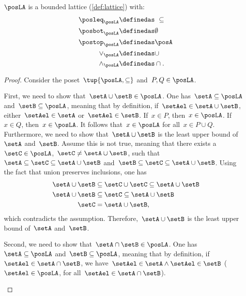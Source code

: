 \begin{definition}[Lattice]
\begin{lemma}
  $\posLA$ is a bounded lattice (\cref{def:lattice}) with:
  \begin{equation}
  \begin{aligned}
    \posleq_{\posLA}&\definedas \ \subseteq\\
    \posbot_{\posLA}&\definedas \emptyset\\
    \postop_{\posLA}&\definedas \posA\\
    \vee_{\posLA}&\definedas \cup\\
    \wedge_{\posLA}&\definedas \cap.
  \end{aligned}
  \end{equation}
\end{lemma}
\begin{proof}
  Consider the poset~$\tup{\posLA,\subseteq}$ and~$P,Q\in \posLA$.
  \begin{compactitem}
    \item First, we need to show that~$\setA\cup \setB\in \posLA$.
    One has~$\setA \subseteq \posLA$ and~$\setB\subseteq \posLA$, meaning that by definition, if~$\setAel\in \setA\cup \setB$, either~$\setAel\in \setA$ or~$\setAel\in \setB$.
    If~$x\in P$, then~$x\in \posLA$. If~$x\in Q$, then~$x\in \posLA$. It follows that~$x\in \posLA$ for all~$x\in P\cup Q$.
    Furthermore, we need to show that~$\setA\cup \setB$ is the least upper bound of~$\setA$ and~$\setB$.
    Assume this is not true, meaning that  there exists a~$\setC\in \posLA$,~$\setC\neq \setA\cup \setB$, such that~$\setA\subseteq \setC\subseteq \setA\cup \setB$ and~$\setB\subseteq \setC\subseteq \setA\cup \setB$.
    Using the fact that union preserves inclusions, one has
    \begin{equation}
      \begin{aligned}
        \setA\cup \setB &\subseteq \setC\cup \setC \subseteq \setA\cup \setB\\
        \setA\cup \setB &\subseteq \setC \subseteq \setA\cup \setB\\
        \setC&= \setA\cup \setB,
      \end{aligned}
    \end{equation}
    which contradicts the assumption. Therefore,~$\setA\cup \setB$ is the least upper bound of~$\setA$ and~$\setB$.
    \item Second, we need to show that~$\setA\cap \setB\in \posLA$.
    One has~$\setA\subseteq \posLA$ and~$\setB\subseteq \posLA$, meaning that by definition, if~$\setAel\in \setA\cap \setB$, we have~$\setAel \in \setA\wedge \setAel\in \setB$ ($\setAel\in \posLA$, for all~$\setAel\in \setA\cap \setB$).

\end{compactitem}
\end{proof}
\end{definition}
